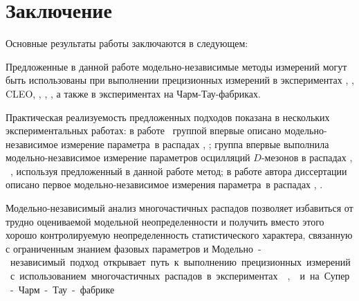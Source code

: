 \chapter*{Заключение}						%


Основные результаты работы заключаются в следующем:


Предложенные в данной работе модельно-независимые методы измерений могут быть использованы при выполнении прецизионных измерений в экспериментах \babar, \belle, \textrm{CLEO}, \besiii, \belleii, \lhcb, а также в экспериментах на Чарм-Тау-фабриках.  

Практическая реализуемость предложенных подходов показана в нескольких экспериментальных работах: в работе~\cite{belle_gamma_binned_dalitz} группой \belle впервые описано модельно-независимое измерение параметра~\gphi в распадах \bdk, \dkpp; группа \lhcb впервые выполнила модельно-независимое измерение параметров осцилляций $D$-мезонов в распадах \dstpdpip, \dnkpp~\cite{lhcb_dkspp_mixing}, используя предложенный в данной работе метод; в работе автора диссертации~\cite{belle_beta_binned_dalitz} описано первое модельно-независимое измерения параметра~\pphi в распадах \bdsth, \dbkpp.

Модельно-независимый анализ многочастичных распадов позволяет избавиться от трудно оцениваемой модельной неопределенности и получить вместо этого хорошо контролируемую неопределенность статистического характера, связанную с ограниченным знанием фазовых параметров \ci и \si.  Модельно-независимый подход открывает путь к выполнению прецизионных измерений с использованием многочастичных распадов в экспериментах \belleii, \lhcb и на Супер-Чарм-Тау-фабрике.

\vspace{3 cm}

